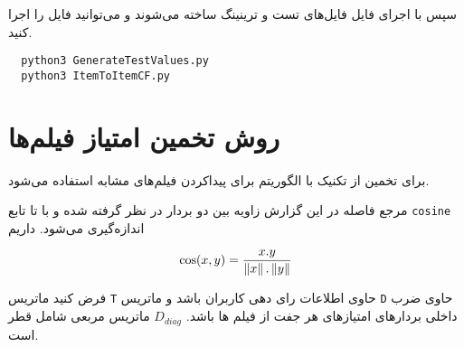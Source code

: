 سپس با اجرای فایل
فایل‌های تست و ترینینگ ساخته می‌شوند و می‌توانید فایل
را اجرا کنید.

\begin{latin}
\begin{lstlisting}
  python3 GenerateTestValues.py
  python3 ItemToItemCF.py
\end{lstlisting}
\end{latin}

\chapter{روش تخمین امتیاز فیلم‌‌ها}
برای تخمین از تکنیک
با الگوریتم
برای پیداکردن فیلم‌های مشابه استفاده می‌شود.

مرجع فاصله در این گزارش زاویه بین دو بردار در نظر گرفته شده و با تا تابع
\verb;cosine;
اندازه‌گیری می‌شود. داریم

\begin{latin}
    \begin{equation}
        \cos(x, y) = \frac{x.y} {\left\lVert x\right\rVert.\left\lVert y\right\rVert}
    \end{equation}
\end{latin}

فرض کنید ماتریس
\verb;T;
حاوی اطلاعات رای دهی کاربران باشد و ماتریس
\verb;D;
حاوی ضرب داخلی بردار‌های امتیاز‌های هر جفت از فیلم ها باشد.
$D_{diag}$
ماتریس مربعی شامل قطر
است.

